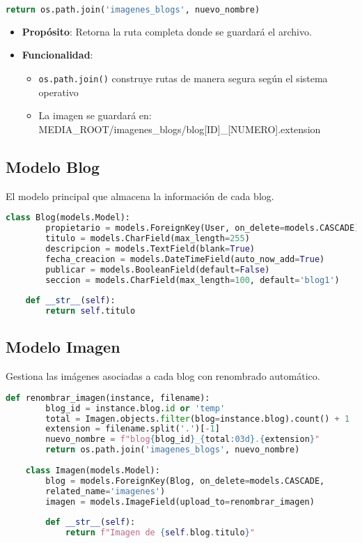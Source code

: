 \documentclass[11pt,a4paper]{report}
\begin{document}
	\begin{lstlisting}[language=Python]
		return os.path.join('imagenes_blogs', nuevo_nombre)
	\end{lstlisting}
	\begin{itemize}
		\item \textbf{Propósito}: Retorna la ruta completa donde se guardará el archivo.
		\item \textbf{Funcionalidad}:
		\begin{itemize}
			\item \texttt{os.path.join()} construye rutas de manera segura según el sistema operativo
			\item La imagen se guardará en: MEDIA\_ROOT/imagenes\_blogs/blog[ID]\_[NUMERO].extension
		\end{itemize}
	\end{itemize}
	
	\subsection{Modelo Blog}
	El modelo principal que almacena la información de cada blog.
	
	\begin{lstlisting}[language=python]
	class Blog(models.Model):
		propietario = models.ForeignKey(User, on_delete=models.CASCADE)
		titulo = models.CharField(max_length=255)
		descripcion = models.TextField(blank=True)
		fecha_creacion = models.DateTimeField(auto_now_add=True)
		publicar = models.BooleanField(default=False)
		seccion = models.CharField(max_length=100, default='blog1')
		
	def __str__(self):
		return self.titulo
	\end{lstlisting}
	
	\subsection{Modelo Imagen}
	Gestiona las imágenes asociadas a cada blog con renombrado automático.
	
	\begin{lstlisting}[language=python]
	def renombrar_imagen(instance, filename):
		blog_id = instance.blog.id or 'temp'
		total = Imagen.objects.filter(blog=instance.blog).count() + 1
		extension = filename.split('.')[-1]
		nuevo_nombre = f"blog{blog_id}_{total:03d}.{extension}"
		return os.path.join('imagenes_blogs', nuevo_nombre)
		
	class Imagen(models.Model):
		blog = models.ForeignKey(Blog, on_delete=models.CASCADE, 
		related_name='imagenes')
		imagen = models.ImageField(upload_to=renombrar_imagen)
		
		def __str__(self):
			return f"Imagen de {self.blog.titulo}"
	\end{lstlisting}
	
\end{document}

